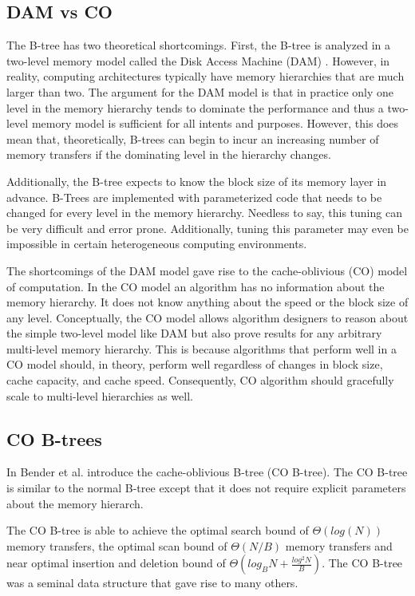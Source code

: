 \documentclass{style}
\begin{document}
\subsection{DAM vs CO}

The B-tree has two theoretical shortcomings. First, the B-tree is analyzed in
a two-level memory model called the Disk Access Machine (DAM) \cite{Aggarwal}.
However, in reality, computing architectures typically have memory hierarchies
that are much larger than two. The argument for the DAM model is that in
practice only one level in the memory hierarchy tends to dominate the
performance and thus a two-level memory model is sufficient for all intents
and purposes. However, this does mean that, theoretically, B-trees can begin
to incur an increasing number of memory transfers if the dominating level in
the hierarchy changes.

Additionally, the B-tree expects to know the block size of its memory layer in
advance. B-Trees are implemented with parameterized code that needs to be
changed for every level in the memory hierarchy. Needless to say, this tuning
can be very difficult and error prone. Additionally, tuning this parameter may
even be impossible in certain heterogeneous computing environments.

The shortcomings of the DAM model gave rise to the cache-oblivious (CO) model
of computation. In the CO model an algorithm has no information about the
memory hierarchy. It does not know anything about the speed or the block size
of any level. Conceptually, the CO model allows algorithm designers to reason
about the simple two-level model like DAM but also prove results for any arbitrary
multi-level memory hierarchy. This is because algorithms that perform well in
a CO model should, in theory, perform well regardless of changes in block
size, cache capacity, and cache speed. Consequently, CO algorithm should
gracefully scale to multi-level hierarchies as well.

\subsection{CO B-trees}

In \cite{BenderDemainColton} Bender et al. introduce the cache-oblivious
B-tree (CO B-tree). The CO B-tree is similar to the normal B-tree except that
it does not require explicit parameters about the memory hierarch.

The CO B-tree is able to achieve the optimal search bound of $\Theta(log(N))$
memory transfers, the optimal scan bound of $\Theta(N/B)$ memory transfers and
near optimal insertion and deletion bound of $\Theta(log_B N +
\frac{log^2{N}}{B})$. The CO B-tree was a seminal data structure that gave
rise to many others.
\end{document}

